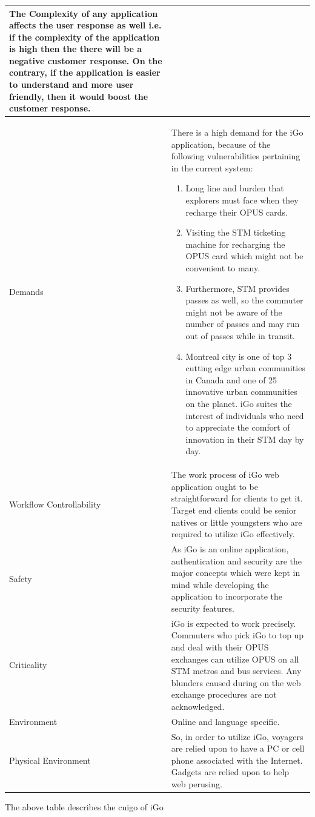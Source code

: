 \documentclass[11pt, english]{report}
\begin{document}
\begin{longtable}[!htbp]{ |p{3cm}|p{12cm}| }
The Complexity of any application affects the user response as well i.e. if the complexity of the application is high then the there will be a negative customer response. On the contrary, if the application is easier to understand and more user friendly, then it would boost the customer response.
  \\
\hline
Demands &

There is a high demand for the iGo application, because of the following vulnerabilities pertaining in the current system: 
\begin{enumerate}
    \item Long line and burden that explorers must face when they recharge their OPUS cards. \item Visiting the STM ticketing machine for recharging the OPUS card which might not be convenient to many.
    \item Furthermore, STM provides passes as well, so the commuter might not be aware of the number of passes and may run out of passes while in transit.
    \item  Montreal city is one of top 3 cutting edge urban communities in Canada and one of 25 innovative urban communities on the planet. iGo suites the interest of individuals who need to appreciate the comfort of innovation in their STM day by day.\cite{tech_city}
\end{enumerate} \\
\hline 

Workflow Controllability & 

The work process of iGo web application ought to be straightforward for clients to get it. Target end clients could be senior natives or little youngsters who are required to utilize iGo effectively.\\
\hline
Safety & 
As iGo is an online application, authentication and security are the major concepts which were kept in mind while developing the application to incorporate the security features.\\
\hline
Criticality & 
iGo is expected to work precisely. Commuters who pick iGo to top up and deal with their OPUS exchanges can utilize OPUS on all STM metros and bus services. Any blunders caused during on the web exchange procedures are not acknowledged.\\
\hline
Environment & Online and language specific.\\
\hline
Physical Environment & 
So, in order to utilize iGo, voyagers are relied upon to have a PC or cell phone associated with the Internet. Gadgets are relied upon to help web perusing.\\
\hline
\end{longtable}
\vspace*{0.1in}
The above table describes the \gls{cuigo} of iGo\\
\end{document}
